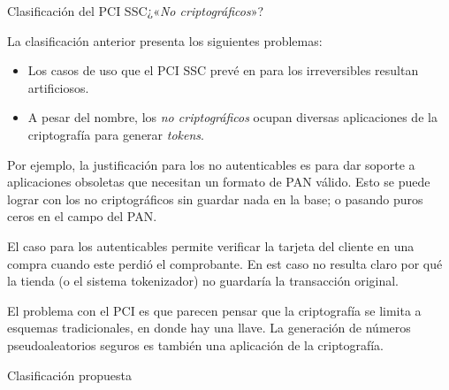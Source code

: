 \begin{frame}{Clasificación del PCI SSC}{¿«\textit{No criptográficos}»?}

  La clasificación anterior presenta los siguientes problemas:

  \begin{itemize}
    \item<1-> Los casos de uso que el PCI SSC prevé en \cite{pci_tokens} para
      los irreversibles resultan artificiosos.
    \item<2-> A pesar del nombre, los \textit{no criptográficos} ocupan
      diversas aplicaciones de la criptografía para generar \textit{tokens}.
  \end{itemize}

  {
    Por ejemplo, la justificación para los no autenticables es para dar
    soporte a aplicaciones obsoletas que necesitan un formato de PAN
    válido. Esto se puede lograr con los no criptográficos sin guardar
    nada en la base; o pasando puros ceros en el campo del PAN.

    El caso para los autenticables permite verificar la tarjeta del cliente
    en una compra cuando este perdió el comprobante. En est caso no resulta
    claro por qué la tienda (o el sistema tokenizador) no guardaría
    la transacción original.
  }

  {
    El problema con el PCI es que parecen pensar que la criptografía se
    limita a esquemas tradicionales, en donde hay una llave. La
    generación de números pseudoaleatorios seguros es también una
    aplicación de la criptografía.
  }

\end{frame}

\begin{frame}{Clasificación propuesta}

\end{frame}
